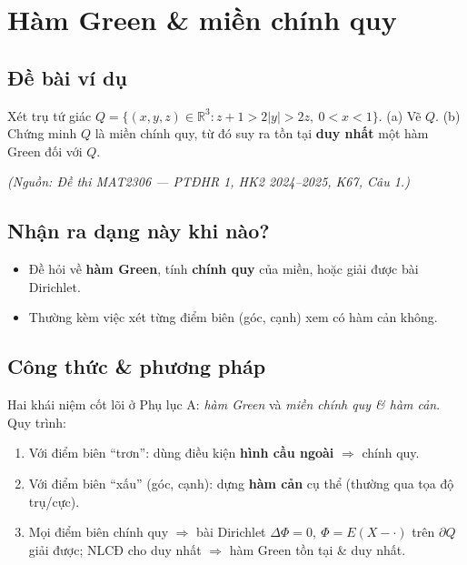 
\section{Hàm Green \& miền chính quy}

\subsection*{Đề bài ví dụ}
Xét trụ tứ giác $Q=\{(x,y,z)\in\mathbb{R}^3: z+1>2|y|>2z,\ 0<x<1\}$.
(a) Vẽ $Q$. (b) Chứng minh $Q$ là miền chính quy, từ đó suy ra tồn tại \textbf{duy nhất} một hàm Green đối với $Q$.

\emph{\small(Nguồn: Đề thi MAT2306 --- PTĐHR 1, HK2 2024--2025, K67, Câu 1.)}

\subsection*{Nhận ra dạng này khi nào?}
\begin{itemize}
  \item Đề hỏi về \textbf{hàm Green}, tính \textbf{chính quy} của miền, hoặc giải được bài Dirichlet.
  \item Thường kèm việc xét từng điểm biên (góc, cạnh) xem có hàm cản không.
\end{itemize}

\subsection*{Công thức \& phương pháp}
Hai khái niệm cốt lõi ở Phụ lục A: \emph{hàm Green} và \emph{miền chính quy \& hàm cản}. Quy trình:
\begin{enumerate}
  \item Với điểm biên ``trơn'': dùng điều kiện \textbf{hình cầu ngoài} $\Rightarrow$ chính quy.
  \item Với điểm biên ``xấu'' (góc, cạnh): dựng \textbf{hàm cản} cụ thể (thường qua tọa độ trụ/cực).
  \item Mọi điểm biên chính quy $\Rightarrow$ bài Dirichlet $\Delta\Phi=0,\ \Phi=E(X-\cdot)$ trên $\partial Q$ giải được; NLCĐ cho duy nhất $\Rightarrow$ hàm Green tồn tại \& duy nhất.
\end{enumerate}

